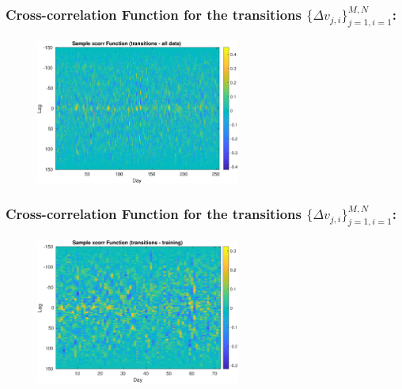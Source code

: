\documentclass[aspectratio=169]{beamer}\usepackage[utf8]{inputenc}
\begin{document}
\begin{frame}\frametitle{Cross-correlation Function for the transitions $\{\Delta v_{j,i}\}_{j=1,i=1}^{M,N}$:}

\begin{figure}[ht!]
\centering
\includegraphics[width=0.6\textwidth]{tran_alldata.eps}
\end{figure}

\end{frame}


\begin{frame}\frametitle{Cross-correlation Function for the transitions $\{\Delta v_{j,i}\}_{j=1,i=1}^{M,N}$:}

\begin{figure}[ht!]
\centering
\includegraphics[width=0.6\textwidth]{tran_training.eps}
\end{figure}

\end{frame}

\end{document}
